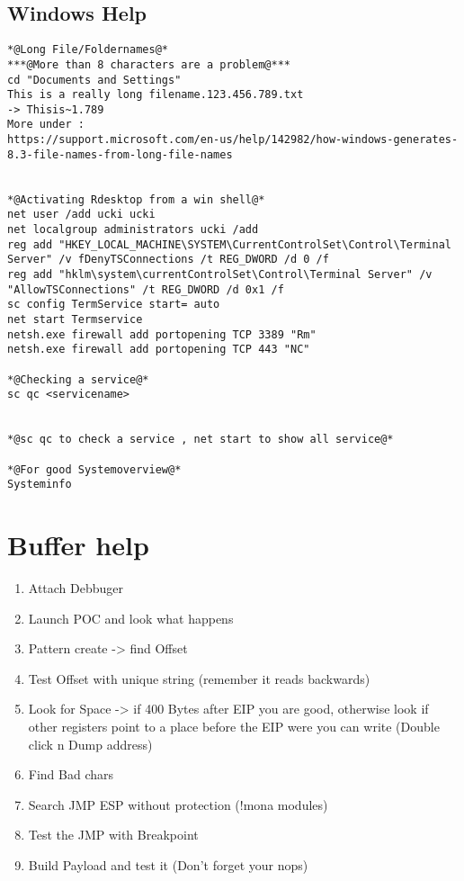 \documentclass[a4paper,12pt, twoside,]{report}
\begin{document}
\subsection{Windows Help}
\begin{lstlisting}[caption={Windows commands},label=wincommands]
*@Long File/Foldernames@*
***@More than 8 characters are a problem@***
cd "Documents and Settings"
This is a really long filename.123.456.789.txt 
-> Thisis~1.789
More under : 
https://support.microsoft.com/en-us/help/142982/how-windows-generates-8.3-file-names-from-long-file-names


*@Activating Rdesktop from a win shell@*
net user /add ucki ucki
net localgroup administrators ucki /add
reg add "HKEY_LOCAL_MACHINE\SYSTEM\CurrentControlSet\Control\Terminal Server" /v fDenyTSConnections /t REG_DWORD /d 0 /f
reg add "hklm\system\currentControlSet\Control\Terminal Server" /v "AllowTSConnections" /t REG_DWORD /d 0x1 /f 
sc config TermService start= auto 
net start Termservice
netsh.exe firewall add portopening TCP 3389 "Rm"
netsh.exe firewall add portopening TCP 443 "NC"

*@Checking a service@*
sc qc <servicename>


*@sc qc to check a service , net start to show all service@*

*@For good Systemoverview@*
Systeminfo
\end{lstlisting}


\newpage
\section{Buffer help}
\begin{enumerate}
	\item Attach Debbuger
	\item Launch POC and look what happens
	\item Pattern create -> find Offset
	\item Test Offset with unique string (remember it reads backwards)
	\item Look for Space -> if 400 Bytes after EIP you are good, otherwise look if other registers point to a place before the EIP were you can write (Double click n Dump address)
	\item Find Bad chars
	\item Search JMP ESP without protection (!mona modules)
	\item Test the JMP with Breakpoint
	\item Build Payload and test it (Don't forget your nops)
\end{enumerate}
\newpage
\end{document}
